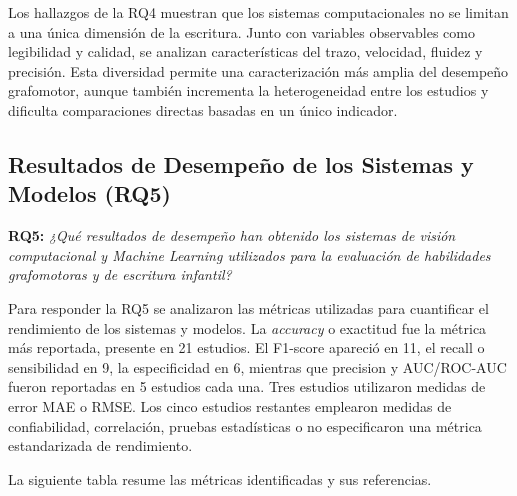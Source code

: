 \documentclass{iaesarticle}
\begin{document}
Los hallazgos de la RQ4 muestran que los sistemas computacionales no se limitan a una única dimensión de la escritura. Junto con variables observables como legibilidad y calidad, se analizan características del trazo, velocidad, fluidez y precisión. Esta diversidad permite una caracterización más amplia del desempeño grafomotor, aunque también incrementa la heterogeneidad entre los estudios y dificulta comparaciones directas basadas en un único indicador.

\FloatBarrier


\subsection{Resultados de Desempeño de los Sistemas y Modelos (RQ5)}
\label{subsec:rq5}

\textbf{RQ5:} \textit{¿Qué resultados de desempeño han obtenido los sistemas de visión computacional y Machine Learning utilizados para la evaluación de habilidades grafomotoras y de escritura infantil?}

Para responder la RQ5 se analizaron las métricas utilizadas para cuantificar el rendimiento de los sistemas y modelos. La \textit{accuracy} o exactitud fue la métrica más reportada, presente en 21 estudios. El F1-score apareció en 11, el recall o sensibilidad en 9, la especificidad en 6, mientras que precision y AUC/ROC-AUC fueron reportadas en 5 estudios cada una. Tres estudios utilizaron medidas de error MAE o RMSE. Los cinco estudios restantes emplearon medidas de confiabilidad, correlación, pruebas estadísticas o no especificaron una métrica estandarizada de rendimiento.

La siguiente tabla resume las métricas identificadas y sus referencias.
\end{document}
